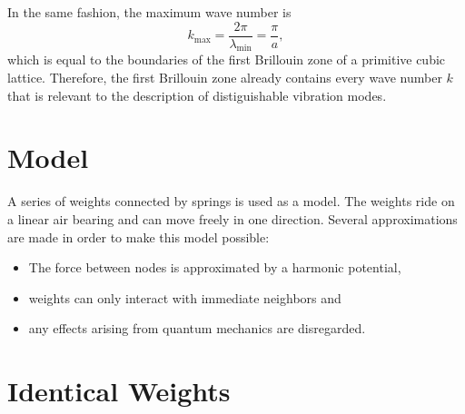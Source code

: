 In the same fashion, the maximum wave number is
\begin{equation*}
	k_\text{max}=\frac{2\pi}{\lambda_\text{min}}=\frac{\pi}{a},
\end{equation*}
which is equal to the boundaries of the first Brillouin zone of a primitive cubic lattice.
Therefore, the first Brillouin zone already contains every wave number $k$ that is relevant to the description of distiguishable vibration modes.

\section{Model}
A series of weights connected by springs is used as a model.
The weights ride on a linear air bearing and can move freely in one direction.
Several approximations are made in order to make this model possible:
\begin{itemize}
	\item The force between nodes is approximated by a harmonic potential,
	\item weights can only interact with immediate neighbors and
	\item any effects arising from quantum mechanics are disregarded.
\end{itemize}

\section{Identical Weights}
